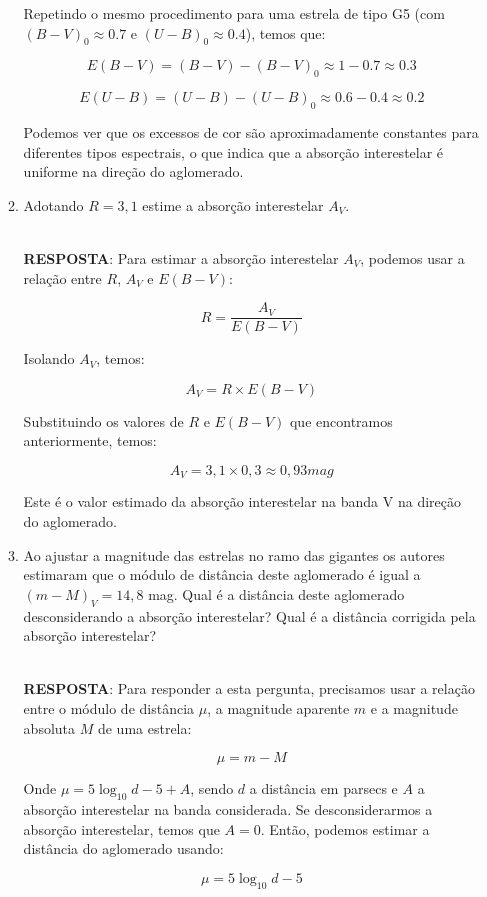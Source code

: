 \documentclass[a4paper,12pt]{article}
\begin{document}
\begin{enumerate}
\begin{enumerate}
Repetindo o mesmo procedimento para uma estrela de tipo G5 (com $(B-V)_0 \approx 0.7$ e $(U-B)_0 \approx 0.4$), temos que:

$$E(B-V) = (B-V) - (B-V)_0 \approx 1 - 0.7 \approx 0.3$$

$$E(U-B) = (U-B) - (U-B)_0 \approx 0.6 - 0.4 \approx 0.2$$

Podemos ver que os excessos de cor são aproximadamente constantes para diferentes tipos espectrais, o que indica que a absorção interestelar é uniforme na direção do aglomerado.

\noindent\hrulefill

\item Adotando $R=3,1$ estime a absorção interestelar $A_V$.

\noindent\hrulefill\\\textbf{RESPOSTA}: Para estimar a absorção interestelar $A_V$, podemos usar a relação entre $R$, $A_V$ e $E(B-V)$:

$$R = \frac{A_V}{E(B-V)}$$

Isolando $A_V$, temos:

$$A_V = R \times E(B-V)$$

Substituindo os valores de $R$ e $E(B-V)$ que encontramos anteriormente, temos:

$$A_V = 3,1 \times 0,3 \approx 0,93 mag$$

Este é o valor estimado da absorção interestelar na banda V na direção do aglomerado.

\noindent\hrulefill

\item Ao ajustar a magnitude das estrelas no ramo das gigantes os autores estimaram que o módulo de distância deste aglomerado é igual a $(m-M)_V=14,8$ mag. Qual é a distância deste aglomerado desconsiderando a absorção interestelar? Qual é a distância corrigida pela absorção interestelar?

\noindent\hrulefill\\\textbf{RESPOSTA}: Para responder a esta pergunta, precisamos usar a relação entre o módulo de distância $\mu$, a magnitude aparente $m$ e a magnitude absoluta $M$ de uma estrela:

$$\mu = m - M$$

Onde $\mu = 5 \log_{10} d - 5 + A$, sendo $d$ a distância em parsecs e $A$ a absorção interestelar na banda considerada. Se desconsiderarmos a absorção interestelar, temos que $A = 0$. Então, podemos estimar a distância do aglomerado usando:

$$\mu = 5 \log_{10} d - 5$$


\end{enumerate}
\end{enumerate}
\end{document}
